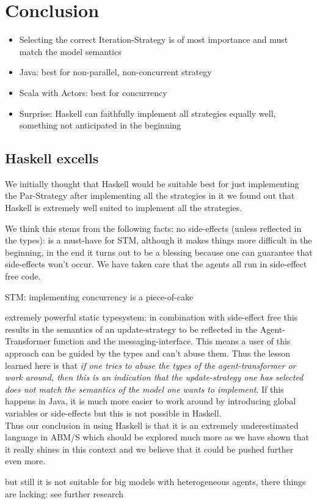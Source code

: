 \section{Conclusion}
\begin{itemize}
	\item Selecting the correct Iteration-Strategy is of most importance and must match the model semantics
	\item Java: best for non-parallel, non-concurrent strategy
	\item Scala with Actors: best for concurrency
	\item Surprise: Haskell can faithfully implement all strategies equally well, something not anticipated in the beginning
\end{itemize} 

\subsection{Haskell excells}
We initially thought that Haskell would be suitable best for just implementing the Par-Strategy after implementing all the strategies in it we found out that Haskell is extremely well suited to implement all the strategies. 

We think this stems from the following facts: 
no side-effects (unless reflected in the types): is a must-have for STM, although it makes things more difficult in the beginning, in the end it turns out to be a blessing because one can guarantee that side-effects won't occur. We have taken care that the agents all run in side-effect free code.
 
STM: implementing concurrency is a piece-of-cake

extremely powerful static typesystem: in combination with side-effect free this results in the semantics of an update-strategy to be reflected in the Agent-Transformer function and the messaging-interface. This means a user of this approach can be guided by the types and can't abuse them. Thus the lesson learned here is that \textit{if one tries to abuse the types of the agent-transformer or work around, then this is an indication that the update-strategy one has selected does not match the semantics of the model one wants to implement}. If this happens in Java, it is much more easier to work around by introducing global variables or side-effects but this is not possible in Haskell. \\
Thus our conclusion in using Haskell is that it is an extremely underestimated language in ABM/S which should be explored much more as we have shown that it really shines in this context and we believe that it could be pushed further even more.

but still it is not suitable for big models with heterogeneous agents, there things are lacking: see further research
